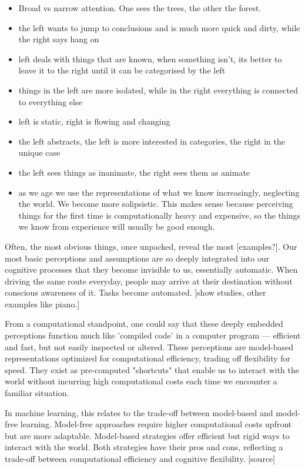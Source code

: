 \begin{itemize}
    \item Broad vs narrow attention. One sees the trees, the other the forest.
    \item the left wants to jump to conclusions and is much more quick and dirty, while the right says hang on
    \item left deals with things that are known, when something isn’t, its better to leave it to the right until it can be categorised by the left
    \item things in the left are more isolated, while in the right everything is connected to everything else
    \item left is static, right is flowing and changing
    \item the left abstracts, the left is more interested in categories, the right in the unique case
    \item the left sees things as inanimate, the right sees them as animate
    \item as we age we use the representations of what we know increasingly, neglecting the world. We become more solipsistic. This makes sense because perceiving things for the first time is computationally heavy and expensive, so the things we know from experience will usually be good enough.
\end{itemize}

Often, the most obvious things, once unpacked, reveal the most [examples?]. Our most basic perceptions and assumptions are so deeply integrated into our cognitive processes that they become invisible to us, essentially automatic. When driving the same route everyday, people may arrive at their destination without conscious awareness of it. Tasks become automated. [show studies, other examples like piano.]

From a computational standpoint, one could say that these deeply embedded perceptions function much like 'compiled code' in a computer program — efficient and fast, but not easily inspected or altered. These perceptions are model-based representations optimized for computational efficiency, trading off flexibility for speed. They exist as pre-computed "shortcuts" that enable us to interact with the world without incurring high computational costs each time we encounter a familiar situation.

In machine learning, this relates to the trade-off between model-based and model-free learning. Model-free approaches require higher computational costs upfront but are more adaptable. Model-based strategies offer efficient but rigid ways to interact with the world. Both strategies have their pros and cons, reflecting a trade-off between computational efficiency and cognitive flexibility. [source]

